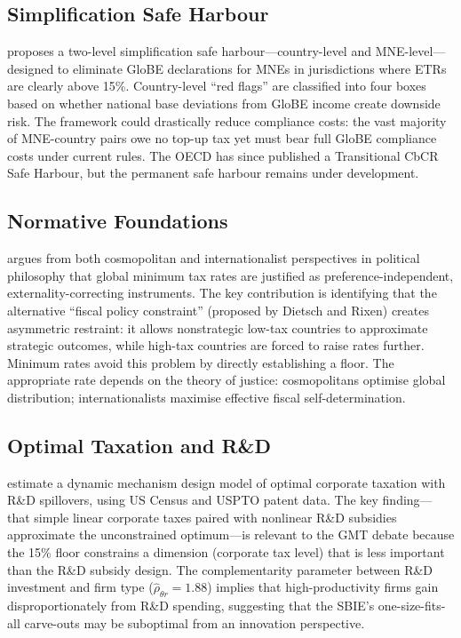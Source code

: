 \documentclass[11pt,a4paper]{article}
\begin{document}
\subsection{Simplification Safe Harbour}
\label{subsec:schanz}

\citet{schanz2023} proposes a two-level simplification safe harbour---country-level and MNE-level---designed to eliminate GloBE declarations for MNEs in jurisdictions where ETRs are clearly above 15\%. Country-level ``red flags'' are classified into four boxes based on whether national base deviations from GloBE income create downside risk. The framework could drastically reduce compliance costs: the vast majority of MNE-country pairs owe no top-up tax yet must bear full GloBE compliance costs under current rules. The OECD has since published a Transitional CbCR Safe Harbour, but the permanent safe harbour remains under development.

\subsection{Normative Foundations}
\label{subsec:cassee}

\citet{cassee2019} argues from both cosmopolitan and internationalist perspectives in political philosophy that global minimum tax rates are justified as preference-independent, externality-correcting instruments. The key contribution is identifying that the alternative ``fiscal policy constraint'' (proposed by Dietsch and Rixen) creates asymmetric restraint: it allows nonstrategic low-tax countries to approximate strategic outcomes, while high-tax countries are forced to raise rates further. Minimum rates avoid this problem by directly establishing a floor. The appropriate rate depends on the theory of justice: cosmopolitans optimise global distribution; internationalists maximise effective fiscal self-determination.

\subsection{Optimal Taxation and R\&D}
\label{subsec:akcigit}

\citet{akcigit2022} estimate a dynamic mechanism design model of optimal corporate taxation with R\&D spillovers, using US Census and USPTO patent data. The key finding---that simple linear corporate taxes paired with nonlinear R\&D subsidies approximate the unconstrained optimum---is relevant to the GMT debate because the 15\% floor constrains a dimension (corporate tax level) that is less important than the R\&D subsidy design. The complementarity parameter between R\&D investment and firm type ($\hat{\rho}_{\theta r} = 1.88$) implies that high-productivity firms gain disproportionately from R\&D spending, suggesting that the SBIE's one-size-fits-all carve-outs may be suboptimal from an innovation perspective.
\end{document}

